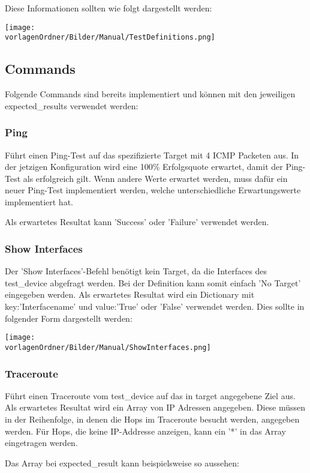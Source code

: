 \documentclass[
	ngerman,
	toc=listof, %
	toc=bibliography, %
	footnotes=multiple, %
	parskip=half, %
	numbers=noendperiod %
]{scrartcl}
\newcommand{\vorlagenOrdner}{../99_Vorlagen} %
\begin{document}
	Diese Informationen sollten wie folgt dargestellt werden: 

	\texttt{[image: \\vorlagenOrdner/Bilder/Manual/TestDefinitions.png]}
	\newpage

	\subsection{Commands}
		Folgende Commands sind bereits implementiert und können mit den jeweiligen expected\_results verwendet werden:
		\subsubsection{Ping}
			Führt einen Ping-Test auf das spezifizierte Target mit 4 ICMP Packeten aus.
			In der jetzigen Konfiguration wird eine 100\% Erfolgsquote erwartet, 
			damit der Ping-Test als erfolgreich gilt.
			Wenn andere Werte erwartet werden, muss dafür ein neuer Ping-Test implementiert
			werden, welche unterschiedliche Erwartungswerte implementiert hat.

			Als erwartetes Resultat kann 'Success' oder 'Failure' verwendet werden.

		\subsubsection{Show Interfaces}
			Der 'Show Interfaces'-Befehl benötigt kein Target, da die Interfaces des test\_device
			abgefragt werden. 
			Bei der Definition kann somit einfach 'No Target' eingegeben werden.
			Als erwartetes Resultat wird ein Dictionary mit key:'Interfacename' und 
			value:'True' oder 'False' verwendet werden.
			Dies sollte in folgender Form dargestellt werden:

			\texttt{[image: \\vorlagenOrdner/Bilder/Manual/ShowInterfaces.png]}

		\subsubsection{Traceroute}
			Führt einen Traceroute vom test\_device auf das in target angegebene Ziel aus.
			Als erwartetes Resultat wird ein Array von IP Adressen angegeben.
			Diese müssen in der Reihenfolge, in denen die Hops im Traceroute besucht werden,
			angegeben werden. Für Hops, die keine IP-Addresse anzeigen, kann ein '*' in das
			Array eingetragen werden.

			Das Array bei expected\_result kann beispielsweise so aussehen:
\end{document}
